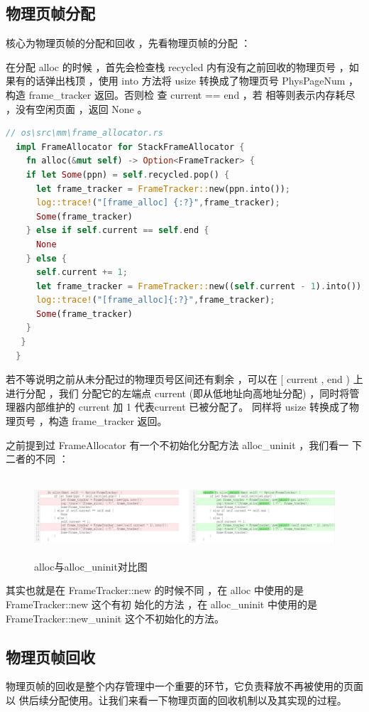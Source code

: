 	\subsection{物理页帧分配}
	核心为物理页帧的分配和回收 ，先看物理页帧的分配 ：
	
	在分配  alloc 的时候 ，首先会检查栈  recycled 内有没有之前回收的物理页号 
	，如果有的话弹出栈顶 ，使用  into 方法将  usize 转换成了物理页号  PhysPageNum ，构造 frame\_tracker 返回。否则检 查 current ==  end ，若
	相等则表示内存耗尽 ，没有空闲页面 ，返回 None 。
\begin{lstlisting}[language=Rust]
  // os\src\mm\frame_allocator.rs
  impl FrameAllocator for StackFrameAllocator {
    fn alloc(&mut self) -> Option<FrameTracker> {
	if let Some(ppn) = self.recycled.pop() {
	  let frame_tracker = FrameTracker::new(ppn.into());
	  log::trace!("[frame_alloc] {:?}",frame_tracker);
	  Some(frame_tracker)
	} else if self.current == self.end {
	  None
	} else {
	  self.current += 1;
	  let frame_tracker = FrameTracker::new((self.current - 1).into());
	  log::trace!("[frame_alloc]{:?}",frame_tracker);
	  Some(frame_tracker)
	}
   }
  }
\end{lstlisting}
	
	若不等说明之前从未分配过的物理页号区间还有剩余 ，可以在 [  current ,  end
	 ) 上进行分配 ，我们 分配它的左端点  current  (即从低地址向高地址分配)  
	 ，同时将管理器内部维护的  current 加  1 代表current 已被分配了。  同样将
	   usize 转换成了物理页号 ，构造 frame\_tracker 返回。
	
	之前提到过 FrameAllocator 有一个不初始化分配方法 alloc\_uninit ，我们看一
	下二者的不同 ：
	\begin{figure}[H]
	  \centering
	  \includegraphics[width=14cm,height=3cm]{figures/04-03-alloc与alloc_uninit对比图.png}
	  \caption{alloc与alloc\_uninit对比图}
	\end{figure}
	
	其实也就是在 FrameTracker::new 的时候不同 ，在 alloc 中使用的是 FrameTracker::new 这个有初 始化的方法 ，在 alloc\_uninit 中使用的是 FrameTracker::new\_uninit 这个不初始化的方法。
	\subsection{物理页帧回收}
	物理页帧的回收是整个内存管理中一个重要的环节，它负责释放不再被使用的页面以
	供后续分配使用。让我们来看一下物理页面的回收机制以及其实现的过程。
	
